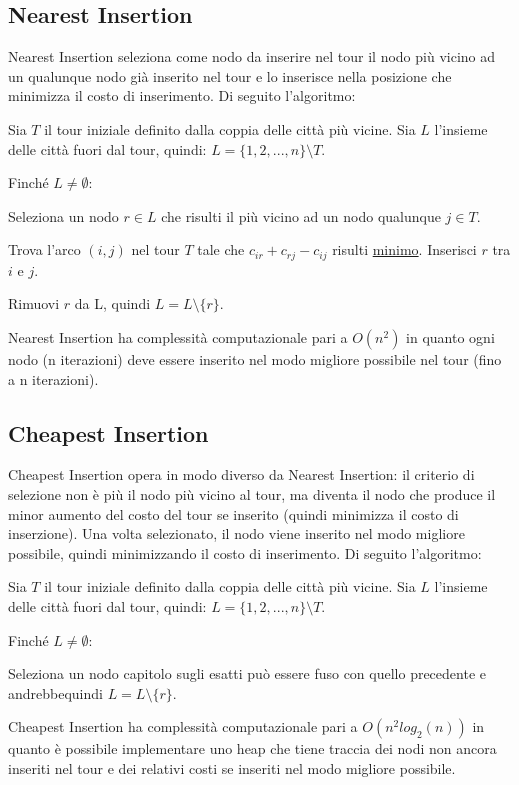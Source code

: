 \documentclass[a4paper,12pt]{report}
\begin{document}
\subsection{Nearest Insertion}
Nearest Insertion seleziona come nodo da inserire nel tour il nodo più vicino ad un qualunque nodo già inserito nel tour e lo inserisce nella posizione che minimizza il costo di inserimento. Di seguito l'algoritmo:

\begin{legal}
  \item Sia $T$ il tour iniziale definito dalla coppia delle città più vicine. Sia $L$ l'insieme delle città fuori dal tour, quindi: $L = \{1, 2, ..., n\} \setminus T$.
  \item Finché $L \neq \emptyset$:
  \begin{legal}
    \item Seleziona un nodo $r \in L$ che risulti il più vicino ad un nodo qualunque $j \in T$.
    \item Trova l'arco $(i, j)$ nel tour $T$ tale che $c_{ir} + c_{rj} - c_{ij}$ risulti \underline{minimo}. Inserisci $r$ tra $i$ e $j$.  
    \item Rimuovi $r$ da L, quindi $L = L \setminus \{r\}$.
  \end{legal}
\end{legal}
\hfill \break Nearest Insertion ha complessità computazionale pari a $O(n^2)$ in quanto ogni nodo (n iterazioni) deve essere inserito nel modo migliore possibile nel tour (fino a n iterazioni).

\subsection{Cheapest Insertion}
Cheapest Insertion opera in modo diverso da Nearest Insertion: il criterio di selezione non è più il nodo più vicino al tour, ma diventa il nodo che produce il minor aumento del costo del tour se inserito (quindi minimizza il costo di inserzione). Una volta selezionato, il nodo viene inserito nel modo migliore possibile, quindi minimizzando il costo di inserimento. Di seguito l'algoritmo:

\begin{legal}
  \item Sia $T$ il tour iniziale definito dalla coppia delle città più vicine. Sia $L$ l'insieme delle città fuori dal tour, quindi: $L = \{1, 2, ..., n\} \setminus T$.
  \item Finché $L \neq \emptyset$:
  \begin{legal}
    \item Seleziona un nodo capitolo sugli esatti può essere fuso con quello precedente e andrebbequindi $L = L \setminus \{r\}$.
  \end{legal}
\end{legal}
\hfill \break Cheapest Insertion ha complessità computazionale pari a $O(n^2 log_2(n))$ in quanto è possibile implementare uno heap che tiene traccia dei nodi non ancora inseriti nel tour e dei relativi costi se inseriti nel modo migliore possibile.
\end{document}
